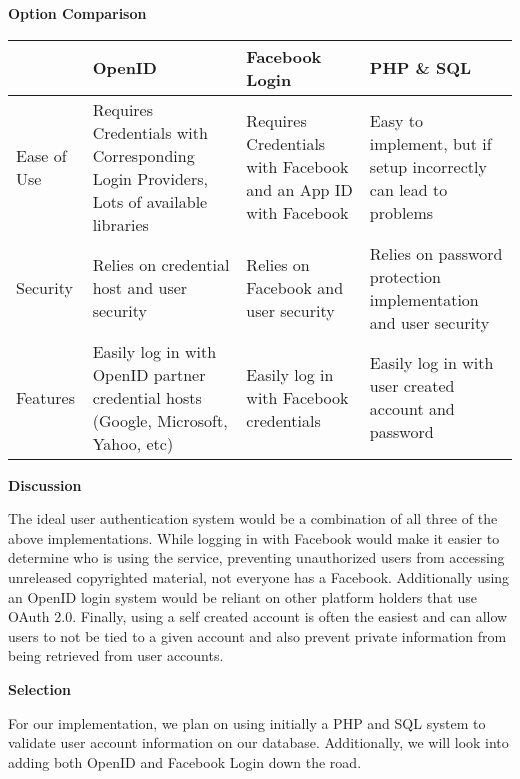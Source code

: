 \documentclass[letterpaper, 10pt, draftclsnofoot, compsoc, onecolumn]{IEEEtran}
\begin{document}
{{ \par}

\vspace{2pc}

\newpage
{\noindent\rmfamily\bfseries\color{black} Option Comparison \par}
\vspace{1pc}
\tablehead{}
\begin{supertabular}{|p{2cm}|p{4cm}|p{4cm}|p{4cm}|}
\hline  
& OpenID 
& Facebook Login 
& PHP \& SQL\\ \hline
Ease of Use 
	& Requires Credentials with Corresponding Login Providers, Lots of available libraries  
	& Requires Credentials with Facebook and an App ID with Facebook 
	& Easy to implement, but if setup incorrectly can lead to problems\\ \hline
Security 
	& Relies on credential host and user security 
	& Relies on Facebook and user security 
	& Relies on password protection implementation and user security\\ \hline
Features 
	& Easily log in with OpenID partner credential hosts (Google, Microsoft, Yahoo, etc) 
	& Easily log in with Facebook credentials 
	& Easily log in with user created account and password \\ \hline

\end{supertabular}

\newpage
{\noindent\rmfamily\bfseries\color{black} Discussion \par}
{\noindent The ideal user authentication system would be a combination of all three of the above implementations. While logging in with Facebook would make it easier to determine who is using the service, preventing unauthorized users from accessing unreleased copyrighted material, not everyone has a Facebook. Additionally using an OpenID login system would be reliant on other platform holders that use OAuth 2.0. Finally, using a self created account is often the easiest and can allow users to not be tied to a given account and also prevent private information from being retrieved from user accounts.\par}

\medskip
{\noindent\rmfamily\bfseries\color{black} Selection \par}
{\noindent For our implementation, we plan on using initially a PHP and SQL system to validate user account information on our database. Additionally, we will look into adding both OpenID and Facebook Login down the road. \par}

}
\end{document}
